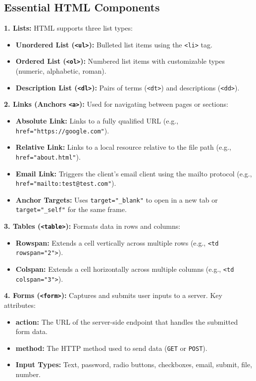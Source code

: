 \documentclass[12pt,a4paper]{article}
\begin{document}
\subsection{Essential HTML Components}

\textbf{1. Lists:} HTML supports three list types:
\begin{itemize}[leftmargin=*, itemsep=3pt]
  \item \textbf{Unordered List (\texttt{<ul>}):} Bulleted list items using the \texttt{<li>} tag.
  \item \textbf{Ordered List (\texttt{<ol>}):} Numbered list items with customizable types (numeric, alphabetic, roman).
  \item \textbf{Description List (\texttt{<dl>}):} Pairs of terms (\texttt{<dt>}) and descriptions (\texttt{<dd>}).
\end{itemize}

\textbf{2. Links (Anchors \texttt{<a>}):} Used for navigating between pages or sections:
\begin{itemize}[leftmargin=*, itemsep=3pt]
  \item \textbf{Absolute Link:} Links to a fully qualified URL (e.g., \texttt{href="https://google.com"}).
  \item \textbf{Relative Link:} Links to a local resource relative to the file path (e.g., \texttt{href="about.html"}).
  \item \textbf{Email Link:} Triggers the client's email client using the mailto protocol (e.g., \texttt{href="mailto:test@test.com"}).
  \item \textbf{Anchor Targets:} Uses \texttt{target="\_blank"} to open in a new tab or \texttt{target="\_self"} for the same frame.
\end{itemize}

\textbf{3. Tables (\texttt{<table>}):} Formats data in rows and columns:
\begin{itemize}[leftmargin=*, itemsep=3pt]
  \item \textbf{Rowspan:} Extends a cell vertically across multiple rows (e.g., \texttt{<td rowspan="2">}).
  \item \textbf{Colspan:} Extends a cell horizontally across multiple columns (e.g., \texttt{<td colspan="3">}).
\end{itemize}

\textbf{4. Forms (\texttt{<form>}):} Captures and submits user inputs to a server. Key attributes:
\begin{itemize}[leftmargin=*, itemsep=3pt]
  \item \textbf{action:} The URL of the server-side endpoint that handles the submitted form data.
  \item \textbf{method:} The HTTP method used to send data (\texttt{GET} or \texttt{POST}).
  \item \textbf{Input Types:} Text, password, radio buttons, checkboxes, email, submit, file, number.
\end{itemize}
\end{document}
